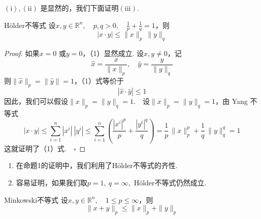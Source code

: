 \documentclass{article}
\begin{document}
\vspace{20pt}

\((\mathrm{i}),(\mathrm{ii})\) 是显然的，我们下面证明\((\mathrm{iii})\).

\newpage

\begin{proposition}{H\"older不等式}{}
    设\(x, y \in \mathbb{R}^n,\quad p, q > 0,\quad \frac{1}{p} + \frac{1}{q} = 1 \)，则
    \begin{equation}
        | x \cdot y | \le \|x\|_p\ \|y\|_q
    \end{equation}
\end{proposition}

\begin{proof}
    如果\(x = 0\) 或\(y = 0\)，（1）显然成立. 设\(x, y \neq 0\)，记
\begin{equation*}
    \hat{x} = \frac{x}{\|x\|_p},\quad \hat{y} = \frac{y}{\|y\|_q}
\end{equation*}
则\(\|\hat{x}\|_p =\|\hat{y}\|= 1 \)，（1）式等价于
\begin{equation*}
    | \hat{x} \cdot \hat{y} | \le 1
\end{equation*}
因此，我们可以假设\(\|x\|_p =\|y\|_q = 1\).\ \ 设\(\|x\|_p =\|y\|_q = 1\)，由 Yang 不等式
\begin{equation*}
    | x \cdot y | \le \sum_{i=1}^n | x^i |\ | y^i | \le \sum_{i=1}^n \left(\frac{ | x^i |^p }{p} + \frac{ | y^i |^q }{q}\right) = \frac{1}{p}\,\|x\|_p^p +\frac{1}{q}\,\|y\|_q^q = 1
\end{equation*}
这就证明了（1）式.\(\quad \square\)
\end{proof}

\vspace{20pt}

\begin{remark}
    \begin{enumerate}
        \item 在命题1的证明中，我们利用了H\"older不等式的齐性.
        \item 容易证明，如果我们取\(p = 1,\ q = \infty \),\ H\"older不等式仍然成立.
    \end{enumerate}
\end{remark}

\newpage

\begin{proposition}{Minkowski不等式}{}
    设\(x,y \in \mathbb{R}^n,\quad 1 \le p \le \infty \)，则
\begin{equation}
    \|x + y\|_p \le \|x\|_p +\|y\|_p
\end{equation}
\end{proposition}
\end{document}
